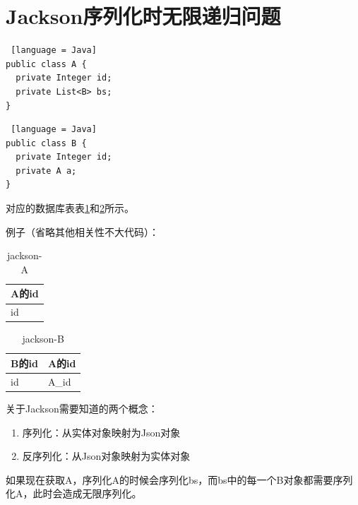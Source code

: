 \section{Jackson序列化时无限递归问题}

\begin{lstlisting} [language = Java]
public class A {
  private Integer id;
  private List<B> bs;
}
\end{lstlisting}

\begin{lstlisting} [language = Java]
public class B {
  private Integer id;
  private A a;
}
\end{lstlisting}

对应的数据库表表\ref{jackson-A}和\ref{jackson-B}所示。

例子（省略其他相关性不大代码）：

\begin{table}[H]
  \centering
  \song\wuhao
  \caption{jackson-A}
  \label{jackson-A}
  \begin{tabular}{|l|}
    \hline
    A的id \\ \hline
    id    \\ \hline
  \end{tabular}
\end{table}

\begin{table}[H]
  \centering
  \song\wuhao
  \caption{jackson-B}
  \label{jackson-B}
  \begin{tabular}{|l|l|}
    \hline
    B的id & A的id \\ \hline
    id    & A\_id \\ \hline
  \end{tabular}
\end{table}

关于Jackson需要知道的两个概念：
\begin{enumerate}
  \item 序列化：从实体对象映射为Json对象
  \item 反序列化：从Json对象映射为实体对象
\end{enumerate}

如果现在获取A，序列化A的时候会序列化bs，而bs中的每一个B对象都需要序列化A，此时会造成无限序列化。

